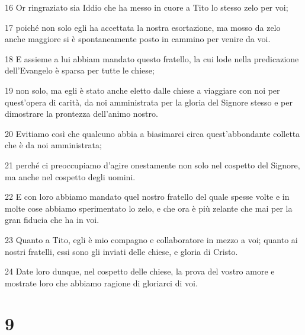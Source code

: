 \par 16 Or ringraziato sia Iddio che ha messo in cuore a Tito lo stesso zelo per voi;
\par 17 poiché non solo egli ha accettata la nostra esortazione, ma mosso da zelo anche maggiore si è spontaneamente posto in cammino per venire da voi.
\par 18 E assieme a lui abbiam mandato questo fratello, la cui lode nella predicazione dell'Evangelo è sparsa per tutte le chiese;
\par 19 non solo, ma egli è stato anche eletto dalle chiese a viaggiare con noi per quest'opera di carità, da noi amministrata per la gloria del Signore stesso e per dimostrare la prontezza dell'animo nostro.
\par 20 Evitiamo così che qualcuno abbia a biasimarci circa quest'abbondante colletta che è da noi amministrata;
\par 21 perché ci preoccupiamo d'agire onestamente non solo nel cospetto del Signore, ma anche nel cospetto degli uomini.
\par 22 E con loro abbiamo mandato quel nostro fratello del quale spesse volte e in molte cose abbiamo sperimentato lo zelo, e che ora è più zelante che mai per la gran fiducia che ha in voi.
\par 23 Quanto a Tito, egli è mio compagno e collaboratore in mezzo a voi; quanto ai nostri fratelli, essi sono gli inviati delle chiese, e gloria di Cristo.
\par 24 Date loro dunque, nel cospetto delle chiese, la prova del vostro amore e mostrate loro che abbiamo ragione di gloriarci di voi.

\chapter{9}

